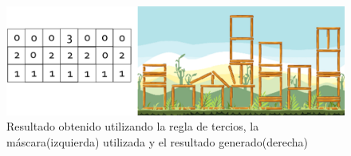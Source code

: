 \begin{figure}
  \centering
  \includegraphics[width=1.0\textwidth]{img/result_example_thirds.png}
  \caption{Resultado obtenido utilizando la regla de tercios, la máscara(izquierda) utilizada y el resultado generado(derecha)}
  \label{figure:ruleofthird_on_chromosome}
\end{figure}


